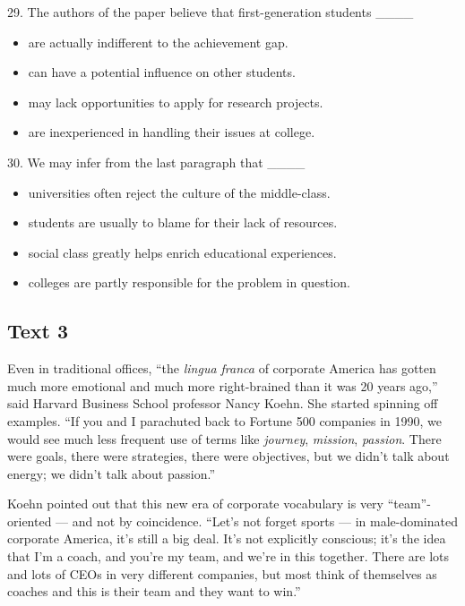 \documentclass[UTF8,11pt]{ctexart}
\begin{document}
29. The authors of the paper believe that first-generation students \_\_\_\_


\begin{itemize}[leftmargin=2em,itemsep=.2em,topsep=.4em]\item[A.] are actually indifferent to the achievement gap.
\item[B.] can have a potential influence on other students.
\item[C.] may lack opportunities to apply for research projects.
\item[D.] are inexperienced in handling their issues at college.
\end{itemize}

30. We may infer from the last paragraph that \_\_\_\_


\begin{itemize}[leftmargin=2em,itemsep=.2em,topsep=.4em]\item[A.] universities often reject the culture of the middle-class.
\item[B.] students are usually to blame for their lack of resources.
\item[C.] social class greatly helps enrich educational experiences.
\item[D.] colleges are partly responsible for the problem in question.
\end{itemize}

\subsection*{\textbf{Text 3}}


Even in traditional offices, “the \textit{lingua franca} of corporate America has gotten much more emotional and much more right-brained than it was 20 years ago,” said Harvard Business School professor Nancy Koehn. She started spinning off examples. “If you and I parachuted back to Fortune 500 companies in 1990, we would see much less frequent use of terms like \textit{journey}, \textit{mission}, \textit{passion}. There were goals, there were strategies, there were objectives, but we didn’t talk about energy; we didn’t talk about passion.”


Koehn pointed out that this new era of corporate vocabulary is very “team”-oriented — and not by coincidence. “Let’s not forget sports — in male-dominated corporate America, it’s still a big deal. It’s not explicitly conscious; it’s the idea that I’m a coach, and you’re my team, and we’re in this together. There are lots and lots of CEOs in very different companies, but most think of themselves as coaches and this is their team and they want to win.”
\end{document}
